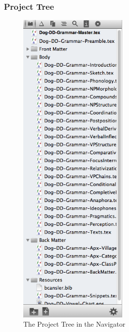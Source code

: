 \subsubsection{Project Tree}
\begin{figure}
\includegraphics[width=0.48\textwidth, trim = 0 7.4in 0 0, clip = true]{TeXnicle-Images/texnicle-nav-projecttree.png}
\caption{The Project Tree in the Navigator}
\label{fig:texnicle-nav-projecttree}
\end{figure}
